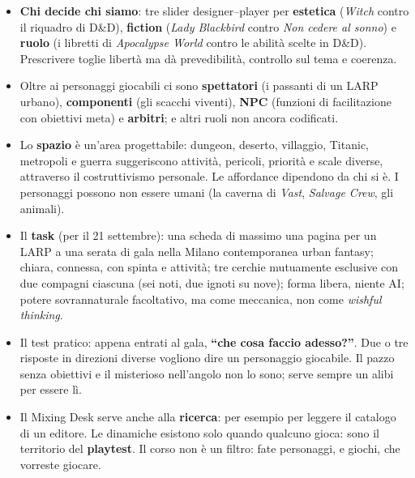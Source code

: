 \begin{itemize}
        coincidere.
  \item \textbf{Chi decide chi siamo}: tre slider designer--player per
        \textbf{estetica} (\emph{Witch} contro il riquadro di D\&D),
        \textbf{fiction} (\emph{Lady Blackbird} contro \emph{Non cedere al sonno})
        e \textbf{ruolo} (i libretti di \emph{Apocalypse World} contro le abilità
        scelte in D\&D). Prescrivere toglie libertà ma dà prevedibilità, controllo
        sul tema e coerenza.
  \item Oltre ai personaggi giocabili ci sono \textbf{spettatori} (i passanti di un
        LARP urbano), \textbf{componenti} (gli scacchi viventi), \textbf{NPC}
        (funzioni di facilitazione con obiettivi meta) e \textbf{arbitri}; e altri
        ruoli non ancora codificati.
  \item Lo \textbf{spazio} è un'area progettabile: dungeon, deserto, villaggio,
        Titanic, metropoli e guerra suggeriscono attività, pericoli, priorità e
        scale diverse, attraverso il costruttivismo personale. Le affordance
        dipendono da chi si è. I personaggi possono non essere umani (la caverna
        di \emph{Vast}, \emph{Salvage Crew}, gli animali).
  \item Il \textbf{task} (per il 21 settembre): una scheda di massimo una pagina per
        un LARP a una serata di gala nella Milano contemporanea urban fantasy;
        chiara, connessa, con spinta e attività; tre cerchie mutuamente esclusive
        con due compagni ciascuna (sei noti, due ignoti su nove); forma libera,
        niente AI; potere sovrannaturale facoltativo, ma come meccanica, non come
        \emph{wishful thinking}.
  \item Il test pratico: appena entrati al gala, \textbf{``che cosa faccio
        adesso?''}. Due o tre risposte in direzioni diverse vogliono dire un
        personaggio giocabile. Il pazzo senza obiettivi e il misterioso nell'angolo
        non lo sono; serve sempre un alibi per essere lì.
  \item Il Mixing Desk serve anche alla \textbf{ricerca}: per esempio per leggere il
        catalogo di un editore. Le dinamiche esistono solo quando qualcuno gioca: sono
        il territorio del \textbf{playtest}. Il corso non è un filtro: fate
        personaggi, e giochi, che vorreste giocare.
\end{itemize}
